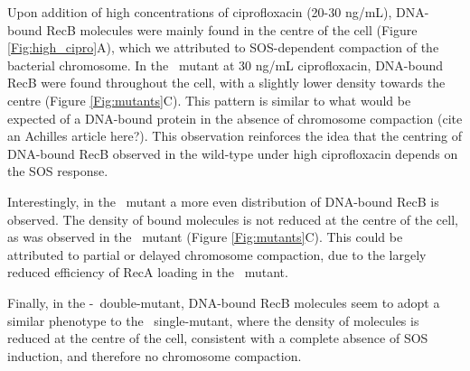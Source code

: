 Upon addition of high concentrations of ciprofloxacin (20-30 ng/mL), DNA-bound RecB molecules were mainly found in the centre of the cell (Figure \ref{Fig:high_cipro}A), which we attributed to SOS-dependent compaction of the bacterial chromosome. In the \dreca\ mutant at 30 ng/mL ciprofloxacin, DNA-bound RecB were found throughout the cell, with a slightly lower density towards the centre (Figure \ref{Fig:mutants}C). This pattern is similar to what would be expected of a DNA-bound protein in the absence of chromosome compaction (cite an Achilles article here?). This observation reinforces the idea that the centring of DNA-bound RecB observed in the wild-type under high ciprofloxacin depends on the SOS response.

Interestingly, in the \teneighty\ mutant a more even distribution of DNA-bound RecB is observed. The density of bound molecules is not reduced at the centre of the cell, as was observed in the \dreca\ mutant (Figure \ref{Fig:mutants}C). This could be attributed to partial or delayed chromosome compaction, due to the largely reduced efficiency of RecA loading in the \teneighty\ mutant.

Finally, in the \dreca-\teneighty\ double-mutant, DNA-bound RecB molecules seem to adopt a similar phenotype to the \dreca\ single-mutant, where the density of molecules is reduced at the centre of the cell, consistent with a complete absence of SOS induction, and therefore no chromosome compaction.

